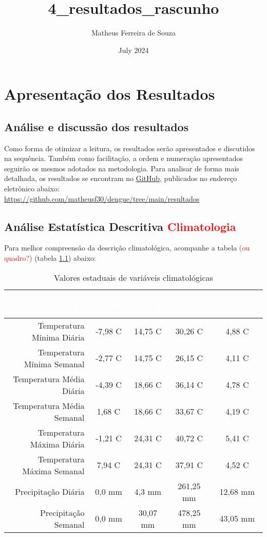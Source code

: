 \documentclass[
	12pt,				%
	openright,			%
	oneside,			%
	a4paper,			%
	english,			%
	french,				%
	spanish,			%
	brazil				%
	dvipsnames, table]{abntex2}
\title{4_resultados_rascunho}
\author{Matheus Ferreira de Souza}
\date{July 2024}
\begin{document}
\maketitle

\newpage

\chapter{Apresentação dos Resultados}

\section{Análise e discussão dos resultados}

\indent Como forma de otimizar a leitura, os resultados serão apresentados e discutidos na sequência. Também como facilitação, a ordem e numeração apresentados seguirão os mesmos adotados na metodologia. Para analisar de forma mais detalhada, os resultados se encontram no \href{https://github.com/matheusf30/dengue/tree/main/resultados}{GitHub}, publicados no endereço eletrônico abaixo:\\
\url{https://github.com/matheusf30/dengue/tree/main/resultados}\\


\section{Análise Estatística Descritiva \textcolor{red}{Climatologia}}

\indent Para melhor compreensão da descrição climatológica, acompanhe a tabela \textcolor{red}{(ou quadro?)} (tabela \ref{tab:valores_climato}) abaixo:

\begin{table}[htbp]
    \centering
    \caption{Valores estaduais de variáveis climatológicas}
    {
    \begin{tabular}{r|cccc}
    \hline
    \toprule
    \rowcolor{darkgray} \textcolor{white}{Valores Estaduais} & \textcolor{white}{Mínima} & \textcolor{white}{Média} & \textcolor{white}{Máxima} & \textcolor{white}{Desvio Padrão}\\
    \midrule
    Temperatura Mínima Diária & -7,98 C & 14,75 C& 30,26 C & 4,88 C\\
    Temperatura Mínima Semanal & -2,77 C & 14,75 C & 26,15 C & 4,11 C\\
    Temperatura Média Diária & -4,39 C & 18,66 C & 36,14 C & 4,78 C\\
    Temperatura Média Semanal & 1,68 C & 18,66 C & 33,67 C & 4,19 C\\
    Temperatura Máxima Diária & -1,21 C & 24,31 C & 40,72 C & 5,41 C\\
    Temperatura Máxima Semanal & 7,94 C & 24,31 C & 37,91 C & 4,52 C\\ 
    Precipitação Diária & 0,0 mm & 4,3 mm & 261,25 mm & 12,68 mm\\
    Precipitação Semanal & 0,0 mm & 30,07 mm & 478,25 mm & 43,05 mm\\
    \bottomrule
    \end{tabular}}
    \label{tab:valores_climato}
\end{table}
\end{document}
